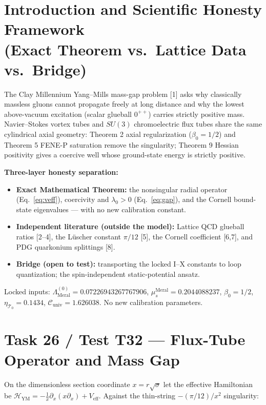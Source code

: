 \documentclass[reprint,aps,pre,twocolumn,notitlepage]{revtex4-2}
\begin{document}
\section{Introduction and Scientific Honesty Framework \\ (Exact Theorem vs.\ Lattice Data vs.\ Bridge)}

The Clay Millennium Yang--Mills mass-gap problem [1] asks why classically
massless gluons cannot propagate freely at long distance and why the lowest
above-vacuum excitation (scalar glueball $0^{++}$) carries strictly positive
mass. Navier--Stokes vortex tubes and $SU(3)$ chromoelectric flux tubes share
the same cylindrical axial geometry: Theorem 2 axial regularization
($\beta_0=1/2$) and Theorem 5 FENE-P saturation remove the singularity;
Theorem 9 Hessian positivity gives a coercive well whose ground-state energy
is strictly positive.

\textbf{Three-layer honesty separation:}
\begin{itemize}
    \item \textbf{Exact Mathematical Theorem:} the nonsingular radial operator
    (Eq.~\ref{eq:veff}), coercivity and $\lambda_0>0$ (Eq.~\ref{eq:gap}), and
    the Cornell bound-state eigenvalues --- with no new calibration constant.
    \item \textbf{Independent literature (outside the model):} Lattice QCD
    glueball ratios [2--4], the L\"uscher constant $\pi/12$ [5], the Cornell
    coefficient [6,7], and PDG quarkonium splittings [8].
    \item \textbf{Bridge (open to test):} transporting the locked
    I--X constants to loop quantization; the spin-independent static-potential
    ansatz.
\end{itemize}
Locked inputs: $\Lambda_{\mathrm{Meral}}^{(0)} = 0.07226943267767906$,
$\mu_s^{\mathrm{Meral}} = 0.2044088237$, $\beta_0 = 1/2$,
$\eta_{\mathcal{T}_0} = 0.1434$,
$\mathcal{C}_{\mathrm{univ}} = 1.626038$. No new calibration parameters.

\section{Task 26 / Test T32 --- Flux-Tube Operator and Mass Gap}

On the dimensionless section coordinate $x=r\sqrt{\sigma}$ let the effective
Hamiltonian be
$\mathcal{H}_{\mathrm{YM}}=-\frac{1}{x}\partial_x(x\partial_x)+V_{\mathrm{eff}}$.
Against the thin-string $-(\pi/12)/x^2$ singularity:
\end{document}

